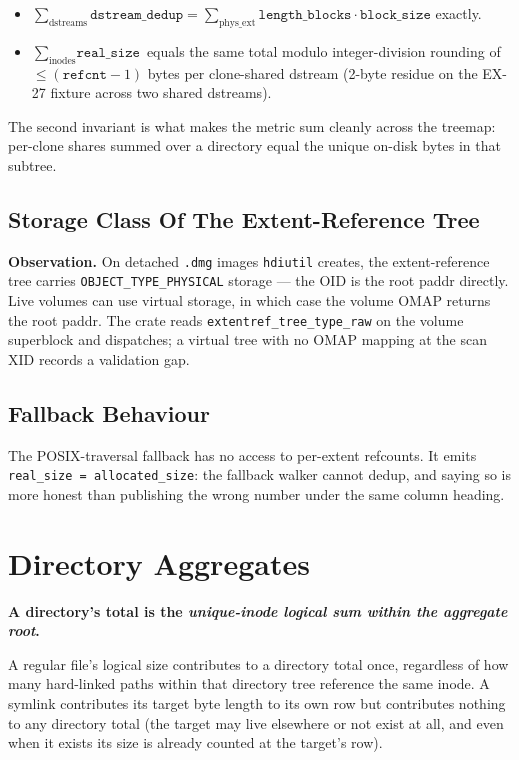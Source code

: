 \begin{itemize}
  \item $\sum_\text{dstreams}\texttt{dstream\_dedup} =
    \sum_\text{phys\_ext}\texttt{length\_blocks} \cdot
    \texttt{block\_size}$ exactly.
  \item $\sum_\text{inodes}\texttt{real\_size}$ equals the same
    total modulo integer-division rounding of $\leq
    (\texttt{refcnt} - 1)$ bytes per clone-shared dstream
    (2-byte residue on the EX-27 fixture across two shared
    dstreams).
\end{itemize}

The second invariant is what makes the metric sum cleanly across
the treemap: per-clone shares summed over a directory equal the
unique on-disk bytes in that subtree.

\subsection{Storage Class Of The Extent-Reference Tree}

\textbf{Observation.} On detached \texttt{.dmg} images
\texttt{hdiutil} creates, the extent-reference tree carries
\texttt{OBJECT\_TYPE\_PHYSICAL} storage --- the OID is the root
paddr directly. Live volumes can use virtual storage, in which case
the volume OMAP returns the root paddr. The crate reads
\texttt{extentref\_tree\_type\_raw} on the volume superblock and
dispatches; a virtual tree with no OMAP mapping at the scan XID
records a validation gap.

\subsection{Fallback Behaviour}

The POSIX-traversal fallback has no access to per-extent
refcounts. It emits \texttt{real\_size = allocated\_size}: the
fallback walker cannot dedup, and saying so is more honest than
publishing the wrong number under the same column heading.

\section{Directory Aggregates}

\textbf{A directory's total is the \emph{unique-inode logical sum
within the aggregate root}.}

A regular file's logical size contributes to a directory total once,
regardless of how many hard-linked paths within that directory tree
reference the same inode. A symlink contributes its target byte
length to its own row but contributes nothing to any directory total
(the target may live elsewhere or not exist at all, and even when it
exists its size is already counted at the target's row).

